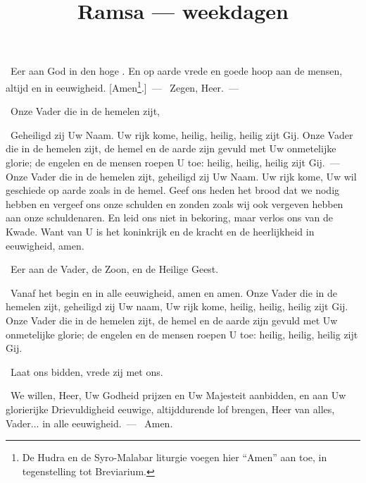 \documentclass[12pt,twoside,a5paper]{article}
\begin{document}
\title{Ramsa --- weekdagen}
\author{}
\date{}
\maketitle


\begin{halfparskip}
  \cc~Eer aan God in den hoge . En op aarde vrede en goede hoop aan de mensen, altijd en in eeuwigheid. [Amen\footnote{De Hudra en de Syro-Malabar liturgie voegen hier ``Amen'' aan toe, in tegenstelling tot Breviarium.}.]~--- \rr~Zegen, Heer.~--- 

  \cc~Onze Vader die in de hemelen zijt,

  \rr~Geheiligd zij Uw Naam. Uw rijk kome, heilig, heilig, heilig zijt Gij. Onze Vader die in de hemelen zijt, de hemel en de aarde zijn gevuld met Uw onmetelijke glorie; de engelen en de mensen roepen U toe: heilig, heilig, heilig zijt Gij.~--- Onze Vader die in de hemelen zijt, geheiligd zij Uw Naam. Uw rijk kome, Uw wil geschiede op aarde zoals in de hemel. Geef ons heden het brood dat we nodig hebben en vergeef ons onze schulden en zonden zoals wij ook vergeven hebben aan onze schuldenaren. En leid ons niet in bekoring, maar verlos ons van de Kwade. Want van U is het koninkrijk en de kracht en de heerlijkheid in eeuwigheid, amen.

  \cc~Eer aan de Vader, de Zoon, en de Heilige Geest.

  \rr~Vanaf het begin en in alle eeuwigheid, amen en amen. Onze Vader die in de hemelen zijt, geheiligd zij Uw naam, Uw rijk kome, heilig, heilig, heilig zijt Gij. Onze Vader die in de hemelen zijt, de hemel en de aarde zijn gevuld met Uw onmetelijke glorie; de engelen en de mensen roepen U toe: heilig, heilig, heilig zijt Gij.

  \dd~Laat ons bidden, vrede zij met ons.

  \cc~We willen, Heer, Uw Godheid prijzen  en Uw Majesteit aanbidden, en aan Uw glorierijke Drievuldigheid eeuwige, altijddurende lof brengen, Heer van alles, Vader... in alle eeuwigheid.~--- \rr~Amen.
\end{halfparskip}


\end{document}
